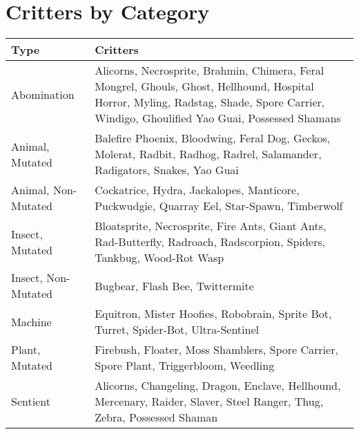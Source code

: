 \documentclass[11pt,a4paper,twocolumn]{book}
\begin{document}
	\chapter*{Critters by Category}
	{
		\begin{tabu} to 160mm{| X[l,1] | X[l,4] |}
			\hline
			 Type &  Critters                                                                                                                                           \\ \hline
			Abomination              & Alicorns, Necrosprite, Brahmin, Chimera, Feral Mongrel, Ghouls, Ghost, Hellhound, Hospital Horror, Myling, Radstag, Shade, Spore Carrier, Windigo, Ghoulified Yao Guai, Possessed Shamans \\
			Animal, Mutated          & Balefire Phoenix, Bloodwing, Feral Dog, Geckos, Molerat, Radbit, Radhog, Radrel, Salamander,  Radigators, Snakes, Yao Guai                                             \\
			Animal, Non-Mutated      & Cockatrice, Hydra, Jackalopes, Manticore, Puckwudgie, Quarray Eel, Star-Spawn, Timberwolf      \\
			Insect, Mutated          & Bloatsprite, Necrosprite, Fire Ants, Giant Ants, Rad-Butterfly, Radroach, Radscorpion, Spiders, Tankbug, Wood-Rot Wasp     \\
			Insect, Non-Mutated      & Bugbear, Flash Bee, Twittermite   \\
			Machine                  & Equitron, Mister Hoofies, Robobrain, Sprite Bot, Turret,   Spider-Bot, Ultra-Sentinel                                                                                  \\
			Plant, Mutated           & Firebush, Floater, Moss Shamblers, Spore Carrier,  Spore Plant, Triggerbloom, Weedling                                                                                 \\
			Sentient                 & Alicorns, Changeling, Dragon, Enclave, Hellhound, Mercenary, Raider, Slaver, Steel Ranger, Thug, Zebra, Possessed Shaman \\ \hline
		\end{tabu}
		
	}
	
\end{document}
